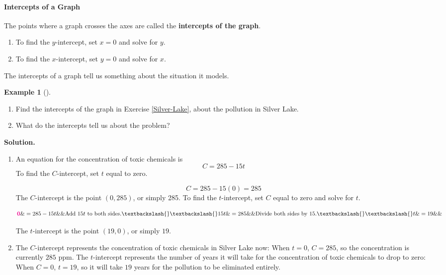\documentclass[10pt,]{book}
\newcommand{\terminology}[1]{\textbf{#1}}
\theoremstyle{plain}
\theoremstyle{definition}
\theoremstyle{definition}
\newtheorem{example}[theorem]{Example}
\numberwithin{equation}{section}
\newcommand{\alert}[1]{\mathbf{\color{magenta}{#1}}}
\begin{document}
\paragraph[Intercepts of a Graph]{Intercepts of a Graph}\label{paragraphs-3}
The points where a graph crosses the axes are called the \terminology{intercepts of the graph}.%
\leavevmode%
\begin{enumerate}
\item\hypertarget{li-52}{}To find the \(y\)-intercept, set \(x=0\) and solve for \(y\).%
\item\hypertarget{li-53}{}To find the \(x\)-intercept, set \(y=0\) and solve for \(x\).%
\end{enumerate}
\par
The intercepts of a graph tell us something about the situation it models.%
\begin{example}[]\label{example-interpret-intercepts}
\leavevmode%
\begin{enumerate}[label=*\alph**]
\item\hypertarget{li-54}{}Find the intercepts of the graph in Exercise \hyperref[Silver-Lake]{\ref{Silver-Lake}}, about the pollution in Silver Lake.%
\item\hypertarget{li-55}{}What do the intercepts tell us about the problem?%
\end{enumerate}
\par\medskip\noindent%
\textbf{Solution.}\quad \leavevmode%
\begin{enumerate}[label=*\alph**]
\item\hypertarget{li-56}{}An equation for the concentration of toxic chemicals is \begin{equation*}C=285-15t\end{equation*} To find the \(C\)-intercept, set \(t\) equal to zero. 

            \begin{equation*}C=285-15(0)=285\end{equation*}
            The \(C\)-intercept is the point \((0, 285)\), or simply 285.  To find the \(t\)-intercept, set \(C\) equal to zero and solve for \(t\).
            
                \begin{align*}
                \alert{0}\&=285-15t \&\&\text{Add }15t \text{ to both sides.}\textbackslash{}\textbackslash{}
                15t\&=285  \&\&\text{Divide both sides by 15.}\textbackslash{}\textbackslash{}
                t\&=19   \&\& 
                \end{align*}


        The \(t\)-intercept is the point \((19,0)\), or simply \(19\).%
\item\hypertarget{li-57}{}The \(C\)-intercept represents the concentration of toxic chemicals in Silver Lake now:  When  \(t=0\), \(C=285\),  so the concentration is currently \(285\) ppm.  The \(t\)-intercept represents the number of years it will take for the concentration of toxic chemicals to drop to zero:  When \(C=0\), \(t=19\),  so it will take \(19\) years for the pollution to be eliminated entirely.%
\end{enumerate}
\end{example}
\end{document}
